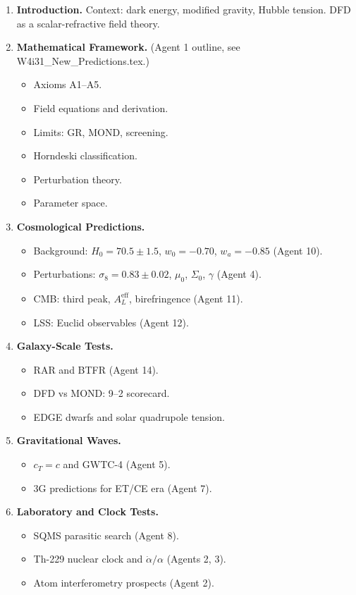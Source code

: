 \documentclass[11pt,a4paper]{article}
\begin{document}
\begin{enumerate}
\item \textbf{Introduction.} Context: dark energy, modified gravity, Hubble tension. DFD as a scalar-refractive field theory.

\item \textbf{Mathematical Framework.} (Agent 1 outline, see W4i31\_New\_Predictions.tex.)
\begin{itemize}
\item Axioms A1--A5.
\item Field equations and derivation.
\item Limits: GR, MOND, screening.
\item Horndeski classification.
\item Perturbation theory.
\item Parameter space.
\end{itemize}

\item \textbf{Cosmological Predictions.}
\begin{itemize}
\item Background: $H_0 = 70.5 \pm 1.5$, $w_0 = -0.70$, $w_a = -0.85$ (Agent 10).
\item Perturbations: $\sigma_8 = 0.83 \pm 0.02$, $\mu_0$, $\Sigma_0$, $\gamma$ (Agent 4).
\item CMB: third peak, $A_L^\mathrm{eff}$, birefringence (Agent 11).
\item LSS: Euclid observables (Agent 12).
\end{itemize}

\item \textbf{Galaxy-Scale Tests.}
\begin{itemize}
\item RAR and BTFR (Agent 14).
\item DFD vs MOND: 9--2 scorecard.
\item EDGE dwarfs and solar quadrupole tension.
\end{itemize}

\item \textbf{Gravitational Waves.}
\begin{itemize}
\item $c_T = c$ and GWTC-4 (Agent 5).
\item 3G predictions for ET/CE era (Agent 7).
\end{itemize}

\item \textbf{Laboratory and Clock Tests.}
\begin{itemize}
\item SQMS parasitic search (Agent 8).
\item Th-229 nuclear clock and $\dot\alpha/\alpha$ (Agents 2, 3).
\item Atom interferometry prospects (Agent 2).
\end{itemize}


\end{enumerate}
\end{document}
